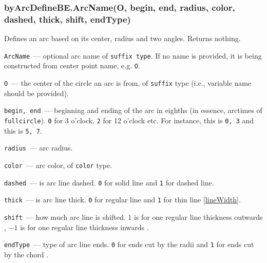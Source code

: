 \subsubsection{byArcDefineBE.ArcName(O, begin, end, radius, color, dashed, thick, shift, endType)}\label{byArcDefineBE}

	Defines an arc based on its center, radius and two angles. Returns nothing.

	
	\texttt{ArcName}~— optional arc name of \texttt{suffix type}. If no name is provided, it is being constructed from center point name, e.g. \texttt{O}.
	
	\texttt{O}~— the center of the circle an arc is from, of \texttt{suffix} type (i.e., variable name should be provided).
	
	\texttt{begin, end}~— beginning and ending of the arc in eighths (in essence, arctimes of \texttt{fullcircle}). \texttt{0} for 3 o'clock, \texttt{2} for 12 o'clock etc. For instance, this
	is \texttt{0, 3} and this
	is \texttt{5, 7}.
	
	\texttt{radius}~— arc radius.
	
	\texttt{color}~— arc color, of \texttt{color} type.
	
	\texttt{dashed}~— is arc line dashed. \texttt{0} for solid line and \texttt{1} for dashed line.
	
	\texttt{thick}~— is arc line thick. \texttt{0} for regular line and \texttt{1} for thin line \ref{lineWidth}.
	
	\texttt{shift}~— how much arc line is shifted. \texttt{$1$} is for one regular line thickness outwards
	, \texttt{$-1$} is for one regular line thickness inwards
	.
	
	\texttt{endType}~— type of arc line ends. \texttt{0} for ends cut by the radii
	and \texttt{1} for ends cut by the chord
	.

